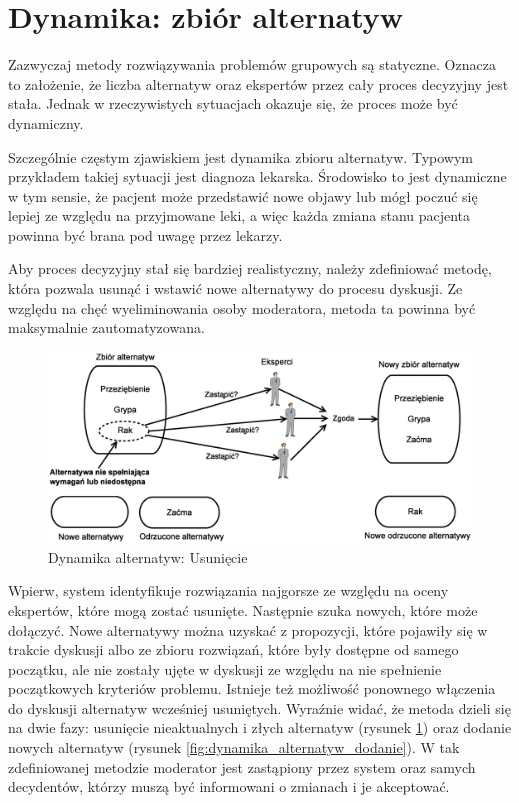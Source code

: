 \section{Dynamika: zbiór alternatyw}
Zazwyczaj metody rozwiązywania problemów grupowych są statyczne. Oznacza to 
założenie, że liczba alternatyw oraz ekspertów przez cały proces decyzyjny jest 
stała. Jednak w rzeczywistych sytuacjach okazuje się, że proces może być 
dynamiczny.

Szczególnie częstym zjawiskiem jest dynamika zbioru alternatyw. Typowym 
przykładem takiej sytuacji jest diagnoza lekarska. Środowisko to jest dynamiczne
w tym sensie, że pacjent może przedstawić nowe objawy lub mógł poczuć się lepiej
ze względu na przyjmowane leki, a więc każda zmiana stanu pacjenta powinna być 
brana pod uwagę przez lekarzy.

Aby proces decyzyjny stał się bardziej realistyczny, należy zdefiniować metodę, 
która pozwala usunąć i wstawić nowe alternatywy do procesu dyskusji. Ze względu 
na chęć wyeliminowania osoby moderatora, metoda ta powinna być maksymalnie 
zautomatyzowana.

\begin{figure}[ht]
  \includegraphics[width=\linewidth]
  	{chapters/modelinggroupdecision/usuniecie_alternatyw}
  \caption{Dynamika alternatyw: Usunięcie}
  \label{fig:dynamika_alternatyw_usuniecie}
\end{figure}

Wpierw, system identyfikuje rozwiązania najgorsze ze względu na oceny ekspertów,
które mogą zostać usunięte. Następnie szuka nowych, które może dołączyć. Nowe 
alternatywy można uzyskać z propozycji, które pojawiły się w trakcie dyskusji 
albo ze zbioru rozwiązań, które były dostępne od samego początku, ale nie 
zostały ujęte w dyskusji ze względu na nie spełnienie początkowych kryteriów 
problemu. Istnieje też możliwość ponownego włączenia do dyskusji alternatyw 
wcześniej usuniętych. Wyraźnie widać, że metoda dzieli się na dwie fazy: 
usunięcie nieaktualnych i złych alternatyw (rysunek
\ref{fig:dynamika_alternatyw_usuniecie}) oraz dodanie nowych alternatyw (rysunek
\ref{fig:dynamika_alternatyw_dodanie}).
W tak zdefiniowanej metodzie moderator jest zastąpiony przez system oraz samych decydentów, którzy muszą być informowani o 
zmianach i je akceptować.

